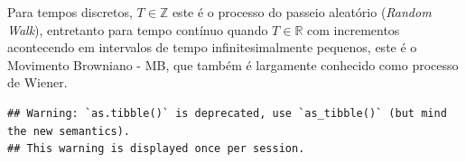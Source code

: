 \documentclass[]{book}
\newenvironment{Shaded}{\begin{snugshade}}{\end{snugshade}}
\newcommand{\CommentTok}[1]{\textcolor[rgb]{0.56,0.35,0.01}{\textit{#1}}}
\newcommand{\ControlFlowTok}[1]{\textcolor[rgb]{0.13,0.29,0.53}{\textbf{#1}}}
\newcommand{\DataTypeTok}[1]{\textcolor[rgb]{0.13,0.29,0.53}{#1}}
\newcommand{\DecValTok}[1]{\textcolor[rgb]{0.00,0.00,0.81}{#1}}
\newcommand{\KeywordTok}[1]{\textcolor[rgb]{0.13,0.29,0.53}{\textbf{#1}}}
\newcommand{\NormalTok}[1]{#1}
\newcommand{\OperatorTok}[1]{\textcolor[rgb]{0.81,0.36,0.00}{\textbf{#1}}}
\newcommand{\StringTok}[1]{\textcolor[rgb]{0.31,0.60,0.02}{#1}}
\theoremstyle{definition}
\theoremstyle{definition}
\theoremstyle{definition}
\theoremstyle{remark}
\begin{document}
Para tempos discretos, \(T\in\mathbb{Z}\) este é o processo do passeio aleatório (\emph{Random Walk}), entretanto para tempo contínuo quando \(T\in\mathbb{R}\) com incrementos acontecendo em intervalos de tempo infinitesimalmente pequenos, este é o Movimento Browniano - MB, que também é largamente conhecido como processo de Wiener.

\begin{Shaded}
\end{Shaded}

\begin{verbatim}
## Warning: `as.tibble()` is deprecated, use `as_tibble()` (but mind the new semantics).
## This warning is displayed once per session.
\end{verbatim}
\end{document}
